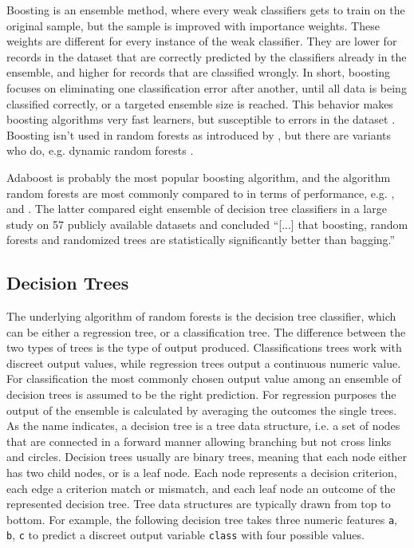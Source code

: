 \documentclass[a4paper,man,12pt,apacite,floatsintext,draftfirst]{apa6} %
\begin{document}
Boosting is an ensemble method, where every weak classifiers gets to train
on the original sample, but the sample is improved with importance weights.
These weights are different for every instance of the weak classifier.
They are lower for records in the dataset that are correctly predicted by
the classifiers already in the ensemble,
and higher for records that are classified wrongly.
In short, boosting focuses on eliminating one classification error after
another, until all data is being classified correctly,
or a targeted ensemble size is reached.
This behavior makes boosting algorithms very fast learners,
but susceptible to errors in the dataset \cite{long2010random}.
Boosting isn't used in random forests as introduced by \cite{breiman2001random},
but there are variants who do, e.g.
dynamic random forests \cite{bernard2012dynamic}.

Adaboost \cite{freund1995decision} is probably the most popular
boosting algorithm, and the algorithm random forests are most commonly
compared to in terms of performance, e.g. \cite{breiman2001random},
\cite{banfield2007comparison} and \cite{rodriguez2006rotation}.
The latter compared eight ensemble of decision tree classifiers in a
large study on 57 publicly available datasets and concluded
“[...] that boosting, random forests and randomized trees are
statistically significantly better than bagging.”

\subsection{Decision Trees}

The underlying algorithm of random forests is the decision tree classifier,
which can be either a regression tree, or a classification tree.
The difference between the two types of trees is the type of output produced.
Classifications trees work with discreet output values,
while regression trees output a continuous numeric value.
For classification the most commonly chosen output value among an ensemble
of decision trees is assumed to be the right prediction.
For regression purposes the output of the ensemble is calculated by averaging
the outcomes the single trees.
As the name indicates, a decision tree is a tree data structure, i.e.
a set of nodes that are connected in a forward manner allowing branching
but not cross links and circles.
Decision trees usually are binary trees, meaning that each node either has
two child nodes, or is a leaf node.
Each node represents a decision criterion, each edge a criterion match or
mismatch, and each leaf node an outcome of the represented decision tree.
Tree data structures are typically drawn from top to bottom.
For example, the following decision tree takes three numeric features
\texttt{a}, \texttt{b}, \texttt{c} to predict a discreet output variable
\texttt{class} with four possible values.
\end{document}
